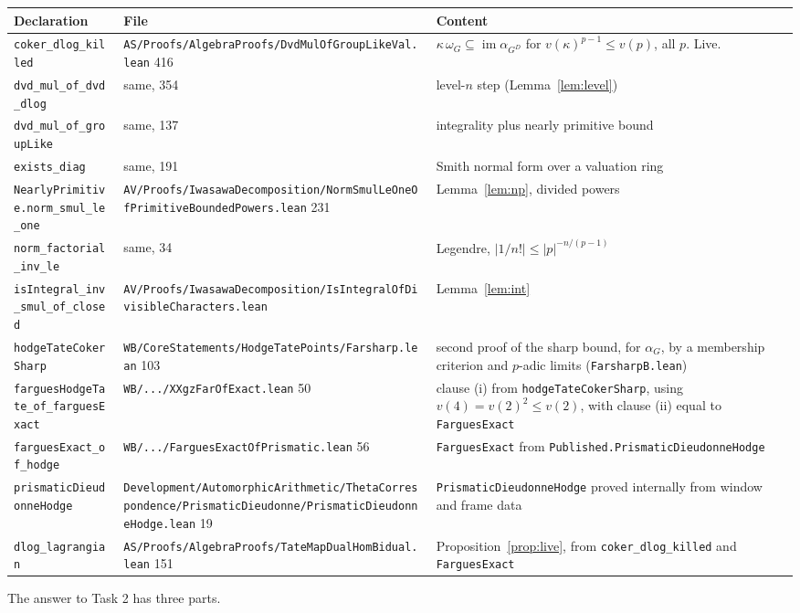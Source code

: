 \documentclass[11pt]{article}
\newcommand{\lean}[1]{\nolinkurl{#1}}
\theoremstyle{definition}
\theoremstyle{remark}
\begin{document}
{\small\begin{longtable}{L{4.4cm}L{5.0cm}L{5.8cm}}
\toprule
Declaration & File & Content\\
\midrule
\lean{coker_dlog_killed} & \lean{AS/Proofs/AlgebraProofs/DvdMulOfGroupLikeVal.lean} 416 & $\kappa\,\omega_G\subseteq\operatorname{im}\alpha_{G^D}$ for $v(\kappa)^{p-1}\le v(p)$, all $p$. Live.\\
\lean{dvd_mul_of_dvd_dlog} & same, 354 & level-$n$ step (Lemma~\ref{lem:level})\\
\lean{dvd_mul_of_groupLike} & same, 137 & integrality plus nearly primitive bound\\
\lean{exists_diag} & same, 191 & Smith normal form over a valuation ring\\
\lean{NearlyPrimitive.norm_smul_le_one} & \lean{AV/Proofs/IwasawaDecomposition/NormSmulLeOneOfPrimitiveBoundedPowers.lean} 231 & Lemma~\ref{lem:np}, divided powers\\
\lean{norm_factorial_inv_le} & same, 34 & Legendre, $\lvert1/n!\rvert\le\lvert p\rvert^{-n/(p-1)}$\\
\lean{isIntegral_inv_smul_of_closed} & \lean{AV/Proofs/IwasawaDecomposition/IsIntegralOfDivisibleCharacters.lean} & Lemma~\ref{lem:int}\\
\lean{hodgeTateCokerSharp} & \lean{WB/CoreStatements/HodgeTatePoints/Farsharp.lean} 103 & second proof of the sharp bound, for $\alpha_G$, by a membership criterion and $p$-adic limits (\lean{FarsharpB.lean})\\
\lean{farguesHodgeTate_of_farguesExact} & \lean{WB/.../XXgzFarOfExact.lean} 50 & clause (i) from \lean{hodgeTateCokerSharp}, using $v(4)=v(2)^2\le v(2)$, with clause (ii) equal to \lean{FarguesExact}\\
\lean{farguesExact_of_hodge} & \lean{WB/.../FarguesExactOfPrismatic.lean} 56 & \lean{FarguesExact} from \lean{Published.PrismaticDieudonneHodge}\\
\lean{prismaticDieudonneHodge} & \lean{Development/AutomorphicArithmetic/ThetaCorrespondence/PrismaticDieudonne/PrismaticDieudonneHodge.lean} 19 & \lean{PrismaticDieudonneHodge} proved internally from window and frame data\\
\lean{dlog_lagrangian} & \lean{AS/Proofs/AlgebraProofs/TateMapDualHomBidual.lean} 151 & Proposition~\ref{prop:live}, from \lean{coker_dlog_killed} and \lean{FarguesExact}\\
\bottomrule
\end{longtable}}

The answer to Task 2 has three parts.
\end{document}
